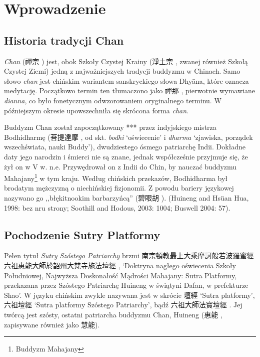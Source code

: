 \maketitle
\section{Wprowadzenie}
\subsection{Historia tradycji Chan}
\emph{Chan} (禪宗 ) jest, obok Szkoły Czystej Krainy (淨土宗 , zwanej również Szkołą Czystej Ziemi) jedną z najważniejszych tradycji buddyzmu w Chinach. Samo słowo \emph{chan} jest chińskim wariantem %
sanskryckiego słowa Dhyāna, które oznacza medytację. %
Początkowo termin ten tłumaczono jako 禪那 , pierwotnie wymawiane \emph{dianna}, co było fonetycznym odwzorowaniem oryginalnego terminu. W późniejszym okresie upowszechniła się skrócona forma \emph{chan}.

Buddyzm Chan został zapoczątkowany *** przez indyjskiego mistrza Bodhidharmę (菩提達摩 , od skt. \emph{bodhi} `oświecenie' i \emph{dharma} `zjawiska, porządek wszechświata, nauki Buddy'), dwudziestego ósmego patriarchę Indii. Dokładne daty jego narodzin i śmierci nie są znane, jednak współcześnie przyjmuje się, że żył on w V w. n.e. Przywędrował on z Indii do Chin, by nauczać buddyzmu Mahajany\footnote{Buddyzm Mahajany} w tym kraju. Według chińskich przekazów, Bodhidharma był brodatym mężczyzną o niechińskiej fizjonomii. Z powodu bariery językowej nazywano go ,,błękitnookim barbarzyńcą'' (碧眼胡 ). (Huineng and Hsüan Hua, 1998: bez nru strony; Soothill and Hodous, 2003: 1004; Buswell 2004: 57).

\subsection{Pochodzenie Sutry Platformy}

Pełen tytuł \emph{Sutry Szóstego Patriarchy} brzmi 南宗頓教最上大乘摩訶般若波羅蜜經六祖惠能大師於韶州大梵寺施法壇經 , `Doktryna nagłego oświecenia Szkoły Południowej, Najwyższa Doskonałość Mądrości Mahajany: Sutra Platformy, przekazana przez Szóstego Patriarchę Huineng w świątyni Dafan, w prefekturze Shao'. W języku chińskim zwykle nazywana jest w skrócie 壇經  `Sutra platformy', 六祖壇經  `Sutra platformy Szóstego Patriarchy', bądź 六祖大師法寶壇經 . Jej twórcą jest szósty, ostatni patriarcha buddyzmu Chan, Huineng (惠能 , zapisywane również jako 慧能). %

